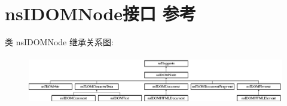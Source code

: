 \hypertarget{interfacens_i_d_o_m_node}{}\section{ns\+I\+D\+O\+M\+Node接口 参考}
\label{interfacens_i_d_o_m_node}
类 ns\+I\+D\+O\+M\+Node 继承关系图\+:\begin{figure}[H]
\begin{center}
\leavevmode
\includegraphics[height=2.133333cm]{interfacens_i_d_o_m_node}
\end{center}
\end{figure}
